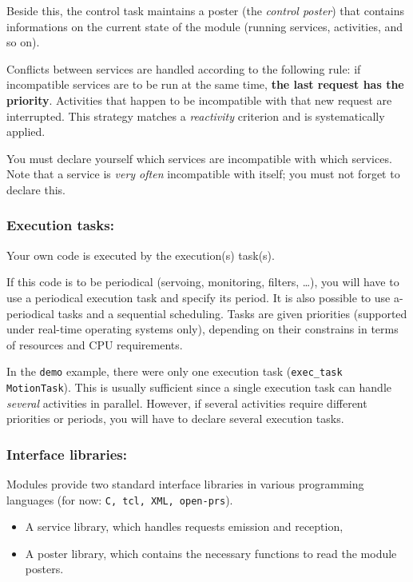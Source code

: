 Beside    this, the control task  maintains   a poster  (the \emph{control
poster}) that contains informations on   the current state of the  module
(running services, activities, and so on).

Conflicts between services are   handled  according to the following  rule:  if
incompatible  services are to  be run  at the  same  time, \textbf{the last
request   has  the  priority}. Activities    that  happen to  be
incompatible  with that new request are  interrupted. This strategy matches a
\emph{reactivity} criterion and is systematically applied.

You must  declare  yourself which  services  are incompatible with  which
services. Note that   a service is  \emph{very often}  incompatible  with
itself; you must not forget to declare this.


\subsubsection{Execution tasks:}

Your own code is executed by the execution(s) task(s).

If  this code is to  be periodical (servoing,  monitoring, filters, \ldots),
you will have to use a periodical  execution task and specify its period.
It   is  also  possible   to use   a-periodical  tasks  and  a  sequential
scheduling. Tasks are  given priorities (supported under real-time
operating systems only),
depending on their constrains in terms of resources and CPU requirements.

In the  \texttt{demo} example,  there were  only one  execution  task 
(\texttt{exec\_task MotionTask}). 
This   is  usually  sufficient since  a   single
execution task can handle \emph{several}  activities in parallel. However,
if several  activities require different  priorities or periods, you will
have to declare several execution tasks.


\subsubsection{Interface libraries:}

Modules provide two standard interface libraries in various programming
languages (for now: \texttt{C, tcl, XML, open-prs}).

\begin{itemize}
\item A service library, which handles requests emission and reception,
\item A poster library, which contains the necessary functions to read
the module posters.
\end{itemize}



